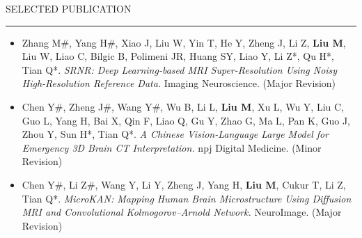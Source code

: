 \documentclass{resume} %
\renewenvironment{rSection}[1]{
\sectionskip
\textcolor{TsinghuaPurple}{\MakeUppercase{#1}}
\sectionlineskip
\hrule
\begin{list}{}{
\setlength{\leftmargin}{0em}
}
\item[]
}{
\end{list}
}
\begin{document}
\begin{rSection}{Selected Publication}
\begin{itemize}
    \item Zhang M\#, Yang H\#, Xiao J, Liu W, Yin T, He Y, Zheng J, Li Z, \textbf{Liu M}, Liu W, Liao C, Bilgic B, Polimeni JR, Huang SY, Liao Y, Li Z*, Qu H*, Tian Q*. \textit{SRNR: Deep Learning-based MRI Super-Resolution Using Noisy High-Resolution Reference Data.} Imaging Neuroscience. (Major Revision)
    
    \item Chen Y\#, Zheng J\#, Wang Y\#, Wu B, Li L, \textbf{Liu M}, Xu L, Wu Y, Liu C, Guo L, Yang H, Bai X, Qin F, Liao Q, Gu Y, Zhao G, Ma L, Pan K, Guo J, Zhou Y, Sun H*, Tian Q*. \textit{A Chinese Vision-Language Large Model for Emergency 3D Brain CT Interpretation.} npj Digital Medicine. (Minor Revision)
    
    \item Chen Y\#, Li Z\#, Wang Y, Li Y, Zheng J, Yang H, \textbf{Liu M}, Cukur T, Li Z, Tian Q*. \textit{MicroKAN: Mapping Human Brain Microstructure Using Diffusion MRI and Convolutional Kolmogorov--Arnold Network.} NeuroImage. (Major Revision)

\end{itemize}

\end{rSection}
\end{document}
